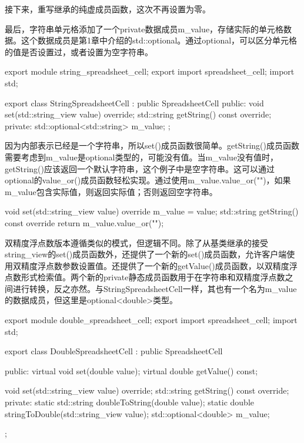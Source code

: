 接下来，重写继承的纯虚成员函数，这次不再设置为零。

最后，字符串单元格添加了一个private数据成员m\_value，存储实际的单元格数据。这个数据成员是第1章中介绍的std::optional。通过optional，可以区分单元格的值是否设置过，或者设置为空字符串。

\begin{cpp}
export module string_spreadsheet_cell;
export import spreadsheet_cell;
import std;

export class StringSpreadsheetCell : public SpreadsheetCell
{
    public:
        void set(std::string_view value) override;
        std::string getString() const override;
    private:
        std::optional<std::string> m_value;
};
\end{cpp}


因为内部表示已经是一个字符串，所以set()成员函数很简单。getString()成员函数需要考虑到m\_value是optional类型的，可能没有值。当m\_value没有值时，getString()应该返回一个默认字符串，这个例子中是空字符串。这可以通过optional的value\_or()成员函数轻松实现。通过使用m\_value.value\_or("")，如果m\_value包含实际值，则返回实际值；否则返回空字符串。

\begin{cpp}
void set(std::string_view value) override { m_value = value; }
std::string getString() const override { return m_value.value_or(""); }
\end{cpp}


双精度浮点数版本遵循类似的模式，但逻辑不同。除了从基类继承的接受string\_view的set()成员函数外，还提供了一个新的set()成员函数，允许客户端使用双精度浮点数参数设置值。还提供了一个新的getValue()成员函数，以双精度浮点数形式检索值。两个新的private静态成员函数用于在字符串和双精度浮点数之间进行转换，反之亦然。与StringSpreadsheetCell一样，其也有一个名为m\_value的数据成员，但这里是optional<double>类型。

\begin{cpp}
export module double_spreadsheet_cell;
export import spreadsheet_cell;
import std;

export class DoubleSpreadsheetCell : public SpreadsheetCell
{
    public:
        virtual void set(double value);
        virtual double getValue() const;

        void set(std::string_view value) override;
        std::string getString() const override;
    private:
        static std::string doubleToString(double value);
        static double stringToDouble(std::string_view value);
        std::optional<double> m_value;
};
\end{cpp}

